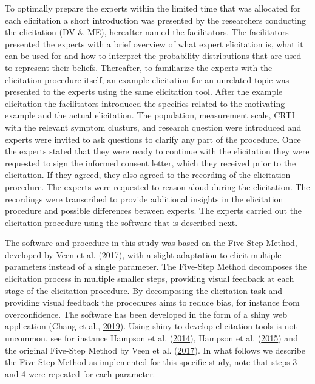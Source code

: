 \documentclass[openright,titlepage,12pt,a4paper]{book}
\begin{document}
To optimally prepare the experts within the limited time that was allocated for each elicitation a short introduction was presented by the researchers conducting the elicitation (DV \& ME), hereafter named the facilitators. The facilitators presented the experts with a brief overview of what expert elicitation is, what it can be used for and how to interpret the probability distributions that are used to represent their beliefs. Thereafter, to familiarize the experts with the elicitation procedure itself, an example elicitation for an unrelated topic was presented to the experts using the same elicitation tool. After the example elicitation the facilitators introduced the specifics related to the motivating example and the actual elicitation. The population, measurement scale, CRTI with the relevant symptom clusturs, and research question were introduced and experts were invited to ask questions to clarify any part of the procedure. Once the experts stated that they were ready to continue with the elicitation they were requested to sign the informed consent letter, which they received prior to the elicitation. If they agreed, they also agreed to the recording of the elicitation procedure. The experts were requested to reason aloud during the elicitation. The recordings were transcribed to provide additional insights in the elicitation procedure and possible differences between experts. The experts carried out the elicitation procedure using the software that is described next.

The software and procedure in this study was based on the Five-Step Method, developed by Veen et al. (\protect\hyperlink{ref-veen_proposal_2017}{2017}), with a slight adaptation to elicit multiple parameters instead of a single parameter. The Five-Step Method decomposes the elicitation process in multiple smaller steps, providing visual feedback at each stage of the elicitation procedure. By decomposing the elicitation task and providing visual feedback the procedures aims to reduce bias, for instance from overconfidence. The software has been developed in the form of a shiny web application (Chang et al., \protect\hyperlink{ref-R-shiny}{2019}). Using shiny to develop elicitation tools is not uncommon, see for instance Hampson et al. (\protect\hyperlink{ref-hampson_bayesian_2014}{2014}), Hampson et al. (\protect\hyperlink{ref-hampson_elicitation_2015}{2015}) and the original Five-Step Method by Veen et al. (\protect\hyperlink{ref-veen_proposal_2017}{2017}). In what follows we describe the Five-Step Method as implemented for this specific study, note that steps 3 and 4 were repeated for each parameter.
\end{document}
